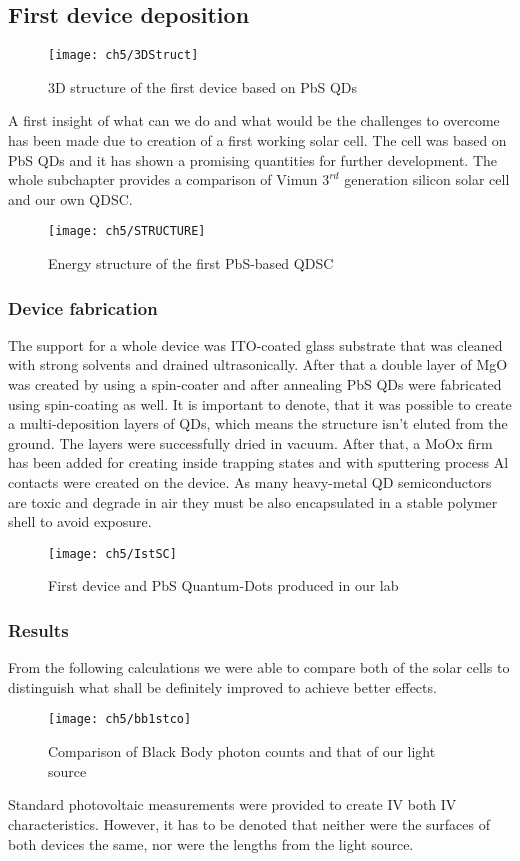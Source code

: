 \subsection{First device deposition}
\begin{figure}[t]
\center
\texttt{[image: ch5/3DStruct]}
\caption{3D structure of the first device based on PbS QDs}
\label{fig:1stStructure}
\end{figure}
A first insight of what can we do and what would be the challenges to overcome has been made due to creation of a first working solar cell. The cell was based on PbS QDs and it has shown a promising quantities for further development. The whole subchapter provides a comparison of Vimun $3^{rd}$ generation silicon solar cell and our own QDSC.
\begin{figure}[H]
\center
\texttt{[image: ch5/STRUCTURE]}
\caption{Energy structure of the first PbS-based QDSC}
\label{fig:1stEnergy}
\end{figure}

\subsubsection{Device fabrication}
\noindent The support for a whole device was ITO-coated glass substrate that was cleaned with strong solvents and drained ultrasonically. After that a double layer of MgO was created by using a spin-coater and after annealing PbS QDs were fabricated using spin-coating as well. It is important to denote, that it was possible to create a multi-deposition layers of QDs, which means the structure isn’t eluted from the ground. The layers were successfully dried in vacuum. After that, a MoOx firm has been added for creating inside trapping states and 
with sputtering process Al contacts were created on the device. As many heavy-metal QD semiconductors are toxic and degrade in air they must be also encapsulated in a stable polymer shell to avoid exposure. 
\begin{figure}
\center
\texttt{[image: ch5/IstSC]}
\caption{First device and PbS Quantum-Dots produced in our lab}
\end{figure}

\subsubsection{Results}
From the following calculations we were able to compare both of the solar cells to distinguish what shall be definitely improved to achieve better effects. 
\begin{wrapfigure}{l}{0.451\textwidth}
\center
\texttt{[image: ch5/bb1stco]}
\caption{Comparison of Black Body photon counts and that of our light source}
\end{wrapfigure}
Standard photovoltaic measurements were provided to create IV both IV characteristics. However, it has to be denoted that neither were the surfaces of both devices the same, nor were the lengths from the light source. 

